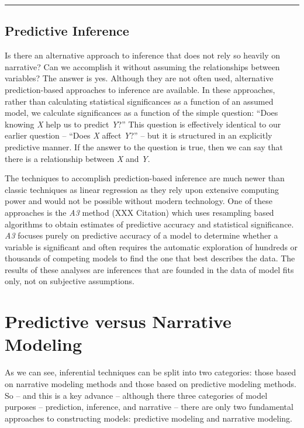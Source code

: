 \documentclass[]{memoir}
\begin{document}
\begin{center}\rule{3in}{0.4pt}\end{center}

\subsection{Predictive Inference}

Is there an alternative approach to inference that does not rely so
heavily on narrative? Can we accomplish it without assuming the
relationships between variables? The answer is yes. Although they are
not often used, alternative prediction-based approaches to inference are
available. In these approaches, rather than calculating statistical
significances as a function of an assumed model, we calculate
significances as a function of the simple question: ``Does knowing
\emph{X} help us to predict \emph{Y}?'' This question is effectively
identical to our earlier question -- ``Does \emph{X} affect \emph{Y}?''
-- but it is structured in an explicitly predictive manner. If the
answer to the question is true, then we can say that there is a
relationship between \emph{X} and \emph{Y}.

The techniques to accomplish prediction-based inference are much newer
than classic techniques as linear regression as they rely upon extensive
computing power and would not be possible without modern technology. One
of these approaches is the \emph{A3} method (XXX Citation) which uses
resampling based algorithms to obtain estimates of predictive accuracy
and statistical significance. \emph{A3} focuses purely on predictive
accuracy of a model to determine whether a variable is significant and
often requires the automatic exploration of hundreds or thousands of
competing models to find the one that best describes the data. The
results of these analyses are inferences that are founded in the data of
model fits only, not on subjective assumptions.

\section{Predictive versus Narrative Modeling}

As we can see, inferential techniques can be split into two categories:
those based on narrative modeling methods and those based on predictive
modeling methods. So -- and this is a key advance -- although there
three categories of model purposes -- prediction, inference, and
narrative -- there are only two fundamental approaches to constructing
models: predictive modeling and narrative modeling.
\end{document}
